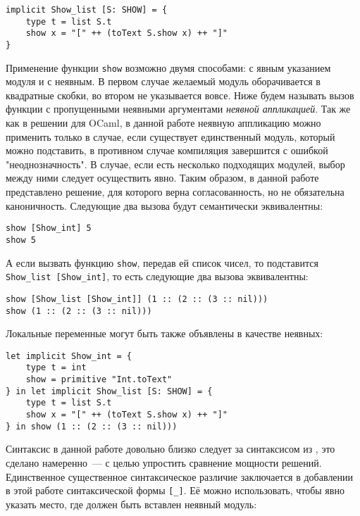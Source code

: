 \documentclass[../diploma.tex]{subfiles}
\begin{document}
\begin{verbatim}
implicit Show_list [S: SHOW] = {
    type t = list S.t
    show x = "[" ++ (toText S.show x) ++ "]"
}
\end{verbatim}

Применение функции \texttt{show} возможно двумя способами: с явным указанием модуля и с неявным. В первом случае желаемый модуль оборачивается в квадратные скобки, во втором не указывается вовсе. Ниже будем называть вызов функции с пропущенными неявными аргументами \textit{неявной аппликацией}. Так же как в решении для OCaml, в данной работе неявную аппликацию можно применить только в случае, если существует единственный модуль, который можно подставить, в противном случае компиляция завершится с ошибкой "неоднозначность". В случае, если есть несколько подходящих модулей, выбор между ними следует осуществить явно. Таким образом, в данной работе представлено решение, для которого верна согласованность, но не обязательна каноничность. Следующие два вызова будут семантически эквивалентны:

\begin{verbatim}
show [Show_int] 5
show 5
\end{verbatim}

А если вызвать функцию \texttt{show}, передав ей список чисел, то подставится \\ \texttt{Show_list [Show_int]}, то есть следующие два вызова эквивалентны:

\begin{verbatim}
show [Show_list [Show_int]] (1 :: (2 :: (3 :: nil)))
show (1 :: (2 :: (3 :: nil)))
\end{verbatim}

Локальные переменные могут быть также объявлены в качестве неявных:

\begin{verbatim}
let implicit Show_int = {
    type t = int
    show = primitive "Int.toText"
} in let implicit Show_list [S: SHOW] = {
    type t = list S.t
    show x = "[" ++ (toText S.show x) ++ "]"
} in show (1 :: (2 :: (3 :: nil)))
\end{verbatim}

Синтаксис в данной работе довольно близко следует за синтаксисом из \cite{white}, это сделано намеренно~--- с целью упростить сравнение мощности решений. Единственное существенное синтаксическое различие заключается в добавлении в этой работе синтаксической формы \texttt{[_]}. Её можно использовать, чтобы явно указать место, где должен быть вставлен неявный модуль:
\end{document}

